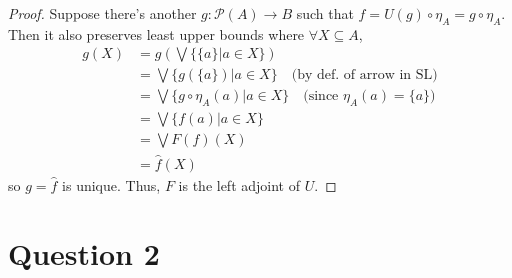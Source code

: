 \documentclass[11pt]{article} %
\theoremstyle{definition}
\theoremstyle{definition}
\theoremstyle{definition}
\begin{document}
\begin{proof}
Suppose there's another $g: \mathcal{P}(A) \rightarrow B$ such that $f = U(g) \circ \eta_A = g\circ\eta_A$.
Then it also preserves least upper bounds where $\forall X\subseteq A$,
\begin{equation}
\begin{aligned}
  g(X) &= g\left(\bigvee \{\{a\} | a\in X\}\right)\\
  &= \bigvee \{g(\{a\}) | a\in X\} \quad \text{(by def. of arrow in SL)}\\
  &= \bigvee \{ g\circ \eta_A (a) | a\in X\} \quad\text{(since $\eta_A(a)=\{a\}$)}\\
  &= \bigvee \{f(a) | a\in X\}\\
  &= \bigvee F(f)(X)\\
  &= \hat{f}(X)
\end{aligned}
\end{equation}
so $g=\hat{f}$ is unique.
Thus, $F$ is the left adjoint of $U$.
\end{proof}


\clearpage
\section*{Question 2}
\addtocounter{section}{1}
\end{document}
